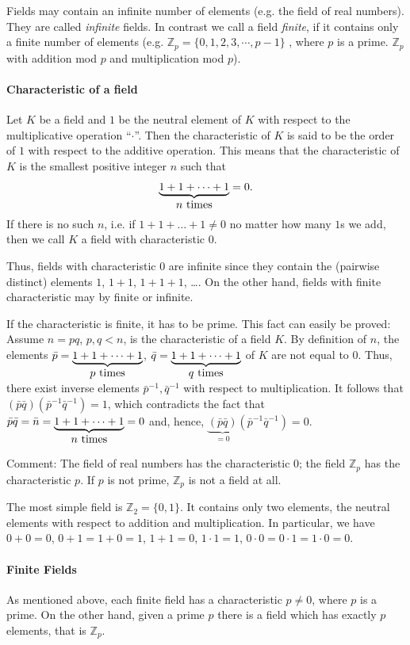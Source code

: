 Fields may contain an infinite number of elements (e.g. the field of real numbers). They are called {\em infinite} fields. In contrast we call a field
{\em finite}, if it contains only a finite number of elements (e.g. ${\mathbb Z}_p = \{0, 1, 2, 3, \cdots, p-1\}$
, where $p$ is a prime. ${\mathbb Z}_p$ with addition mod $p$ and multiplication
mod $p$).
\paragraph{Characteristic of a field}
Let $K$ be a field and $1$ be the neutral element of $K$ with
respect to the multiplicative operation ``$\cdot$''. Then the characteristic of $K$ is said to be the order of $1$ with respect to the additive operation. This means that the characteristic of $K$ is the smallest positive integer $n$ such that
$$ \underbrace{1+1+\dots+1}_{\hbox{$n$ times}} =0 .
$$
If there is no such $n$, i.e. if $1+1+\dots+1\ne 0$ no matter how many $1$s we add, then we call $K$ a field
with characteristic $0$.

Thus, fields with characteristic $0$ are infinite since they contain the (pairwise distinct) elements $1$, $1+1$, $1+1+1$, \dots. On the other hand, fields with finite characteristic may by finite or infinite.

If the characteristic is finite, it has to be prime. This fact can easily be proved: Assume $n=pq$, $p,q<n$, is the characteristic of a field $K$. By definition of $n$, the elements $\bar p=\underbrace{1+1+\dots+1}_{\hbox{$p$ times}}$, $\bar q=\underbrace{1+1+\dots+1}_{\hbox{$q$ times}}$ of $K$ are not equal to $0$. Thus, there exist inverse elements $\bar p^{-1},\bar q^{-1}$ with respect to multiplication. It follows that $(\bar p\bar q)(\bar p^{-1}\bar q^{-1})=1$, which contradicts the fact that $\bar p\bar q=\bar n=\underbrace{1+1+\dots+1}_{\hbox{$n$ times}}=0$ and, hence, $\underbrace{(\bar p\bar q)}_{=0}(\bar p^{-1}\bar q^{-1})=0$.

Comment: The field of real
numbers has the characteristic $0$; the field ${\mathbb Z}_p$ has
the characteristic $p$. If $p$ is not prime, ${\mathbb Z}_p$ is not a field at all.

The most simple field is ${\mathbb Z}_2=\{ 0,1\}$. It contains only two elements, the neutral elements with respect to addition and multiplication. In particular, we have $0+0=0$, $0+1=1+0=1$, $1+1=0$, $1\cdot 1=1$, $0\cdot 0=0\cdot 1=1\cdot 0=0$.

\paragraph{Finite Fields}
As mentioned above, each finite field has a characteristic $p\ne 0$, where $p$ is a prime. On the other hand, given a prime $p$ there is a field which has exactly $p$ elements, that is ${\mathbb Z}_p$.

